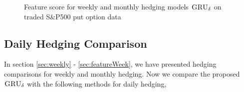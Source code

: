 \documentclass[letterpaper,12pt,titlepage,oneside,final]{book}
\numberwithin{equation}{section}
\theoremstyle{definition}
\newcommand{\model}{\textsc{GRU}_\delta}
\newcommand{\DKLs}{\bf\textsc{DKL}_{\text{SPL}}}
\begin{document}
\begin{figure}[htp]
\centering
\caption{Feature score for weekly and monthly hedging models $\model$ on traded S\&P500 put option  data} \label{fig:put1}
\end{figure}

\subsection{Daily Hedging Comparison}\label{sec:daily}
In section \ref{sec:weekly} - \ref{sec:featureWeek}, we  have presented hedging comparisons for weekly and monthly hedging. Now we compare the proposed $\model$  with the following methods for daily hedging,

\end{document}
